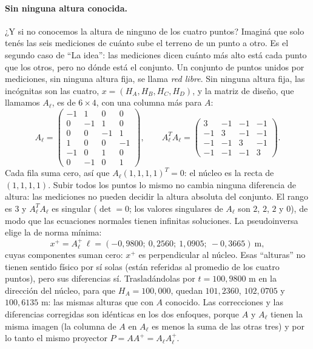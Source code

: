 \paragraph{Sin ninguna altura conocida.} ¿Y si no conocemos la altura de ninguno de los
cuatro puntos?
Imaginá que solo tenés las seis mediciones de cuánto sube el terreno de un punto a otro. Es el
segundo caso de \enquote{La idea}: las mediciones dicen cuánto más alto está cada punto que
los otros, pero no dónde está el conjunto. Un conjunto de puntos unidos por mediciones, sin
ninguna altura fija, se llama \emph{red libre}. Sin ninguna altura fija, las incógnitas son
las cuatro,
\(x=(H_A,H_B,H_C,H_D)\), y la matriz de diseño, que llamamos \(A_\ell\), es de \(6\times4\),
con una columna más para \(A\):
\[
  A_\ell=\begin{pmatrix}-1&1&0&0\\0&-1&1&0\\0&0&-1&1\\1&0&0&-1\\-1&0&1&0\\0&-1&0&1\end{pmatrix},
  \qquad
  A_\ell^TA_\ell=\begin{pmatrix}3&-1&-1&-1\\-1&3&-1&-1\\-1&-1&3&-1\\-1&-1&-1&3\end{pmatrix}.
\]
Cada fila suma cero, así que \(A_\ell(1,1,1,1)^T=0\): el núcleo es la recta de
\((1,1,1,1)\). Subir todos los puntos lo mismo no cambia ninguna diferencia de altura: las
mediciones no pueden decidir la altura absoluta del conjunto. El rango es \(3\) y
\(A_\ell^TA_\ell\) es
singular (\(\det=0\); los valores singulares de \(A_\ell\) son \(2\), \(2\), \(2\) y \(0\)),
de modo que
las ecuaciones normales tienen infinitas soluciones. La pseudoinversa elige la de norma
mínima:
\[
  x^{+}=A_\ell^{+}\,\ell=(-0{,}9800;\ 0{,}2560;\ 1{,}0905;\ -0{,}3665)\ \text{m},
\]
cuyas componentes suman cero: \(x^{+}\) es perpendicular al núcleo. Esas \enquote{alturas} no tienen
sentido físico por sí solas (están referidas al promedio de los cuatro puntos), pero sus
diferencias sí. Trasladándolas por \(t=100{,}9800\) m en la dirección del núcleo, para que
\(H_A=100{,}000\), quedan \(101{,}2360\), \(102{,}0705\) y \(100{,}6135\) m: las mismas alturas
que con \(A\) conocido. Las correcciones y las diferencias corregidas son idénticas en los dos
enfoques, porque \(A\) y \(A_\ell\) tienen la misma imagen (la columna de \(A\) en
\(A_\ell\) es menos la suma de las otras tres) y por lo tanto el mismo proyector
\(P=AA^{+}=A_\ell A_\ell^{+}\).

